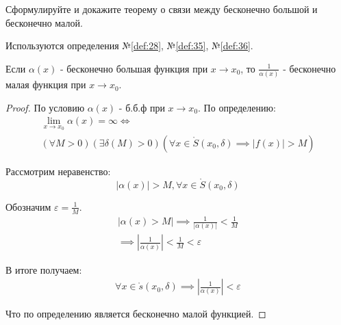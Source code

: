 \begin{question}
    Сформулируйте и докажите теорему о связи между бесконечно большой и бесконечно малой.
\end{question}
\begin{used}
    Используются определения №\ref{def:28}, №\ref{def:35}, №\ref{def:36}.
\end{used}
\begin{theorem}
    Если $\alpha(x)$ - бесконечно большая функция при $x \to x_0$, то $\frac{1}{\alpha(x)}$ - бесконечно малая функция при $x \to x_0$.
\end{theorem}
\begin{proof}
    По условию $\alpha(x)$ - б.б.ф при $x \to x_0$. По определению:
    \begin{gather*}
        \lim_{x \to x_0} \alpha(x) = \infty \iff \\
        (\forall M > 0)(\exists \delta(M) > 0)(\forall x \in \mathring{S}(x_0, \delta) \implies |f(x)| > M)
    \end{gather*}

    Рассмотрим неравенство: \[
        |\alpha(x)| > M, \forall x \in \mathring{S}(x_0, \delta)
    \]

    Обозначим $\varepsilon = \frac{1}{M}$.
    \begin{gather*}
        |\alpha(x) > M| \implies \frac{1}{|\alpha(x)|} < \frac{1}{M} \\
        \implies \left|\frac{1}{\alpha(x)}\right| < \frac{1}{M} < \varepsilon
    \end{gather*}

    В итоге получаем:
    \begin{gather*}
        \forall x \in \mathring{s}(x_0, \delta) \implies \left|\frac{1}{\alpha(x)}\right| < \varepsilon 
    \end{gather*}

    Что по определению является бесконечно малой функцией.
\end{proof}
\pagebreak




